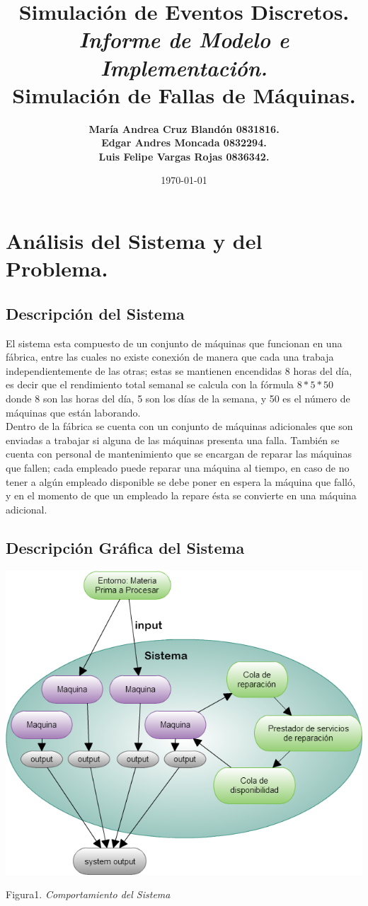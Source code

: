 \documentclass[10pt]{article}
\title{Simulación de Eventos Discretos.\\ \emph{Informe de Modelo e Implementación.} \\ \textbf{Simulación de Fallas de Máquinas.} }
\author{\textbf{María Andrea Cruz Blandón  0831816.} \\ \textbf{Edgar Andres Moncada 0832294.  }\\ \textbf{Luis Felipe Vargas Rojas 0836342. }}
\date{\today}
\begin{document}
\maketitle

\section{Análisis del Sistema y del Problema.}
\subsection{Descripción del Sistema}
El sistema esta compuesto de un conjunto de máquinas que funcionan en una fábrica, entre las cuales no existe conexión de manera que cada una trabaja independientemente de las otras; estas se mantienen encendidas 8 horas del día, es decir que el rendimiento total semanal se calcula con la fórmula $8*5*50$ donde 8 son las  horas del día, 5 son los días de la  semana, y 50 es el número de máquinas que están laborando.\\

Dentro de la fábrica se cuenta con un conjunto de máquinas adicionales que son enviadas a trabajar si alguna de las máquinas presenta una falla. También se cuenta con personal de mantenimiento que se encargan de reparar las máquinas que fallen; cada empleado puede reparar una máquina al tiempo, en caso de no tener a algún empleado disponible se debe poner en espera la máquina que falló, y en el momento de que un empleado la repare ésta se convierte en una máquina adicional.


\subsection{Descripción Gráfica del Sistema}
\begin{center}

\includegraphics[scale=0.47]{Simulacion.png}

Figura1. \emph{Comportamiento del Sistema}
\end{center}
\end{document}
